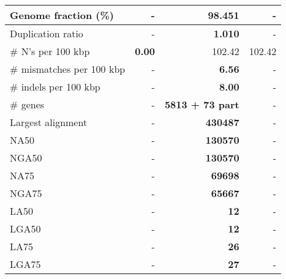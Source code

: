\documentclass[12pt,a4paper]{article}
\begin{document}
\begin{table}[ht]
\begin{center}
\begin{tabular}{|l*{3}{|r}|}
Genome fraction (\%) & - & {\bf 98.451} & - \\ \hline
Duplication ratio & - & {\bf 1.010} & - \\ \hline
\# N's per 100 kbp & {\bf 0.00} & 102.42 & 102.42 \\ \hline
\# mismatches per 100 kbp & - & {\bf 6.56} & - \\ \hline
\# indels per 100 kbp & - & {\bf 8.00} & - \\ \hline
\# genes & - & {\bf 5813 + 73 part} & - \\ \hline
Largest alignment & - & {\bf 430487} & - \\ \hline
NA50 & - & {\bf 130570} & - \\ \hline
NGA50 & - & {\bf 130570} & - \\ \hline
NA75 & - & {\bf 69698} & - \\ \hline
NGA75 & - & {\bf 65667} & - \\ \hline
LA50 & - & {\bf 12} & - \\ \hline
LGA50 & - & {\bf 12} & - \\ \hline
LA75 & - & {\bf 26} & - \\ \hline
LGA75 & - & {\bf 27} & - \\ \hline
\end{tabular}
\end{center}
\end{table}
\end{document}
